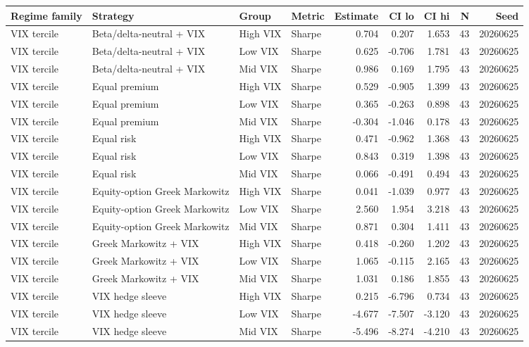 \begin{tabular}{llllrrrrr}
\toprule
Regime family & Strategy & Group & Metric & Estimate & CI lo & CI hi & N & Seed \\
\midrule
VIX tercile & Beta/delta-neutral + VIX & High VIX & Sharpe & 0.704 & 0.207 & 1.653 & 43 & 20260625 \\
VIX tercile & Beta/delta-neutral + VIX & Low VIX & Sharpe & 0.625 & -0.706 & 1.781 & 43 & 20260625 \\
VIX tercile & Beta/delta-neutral + VIX & Mid VIX & Sharpe & 0.986 & 0.169 & 1.795 & 43 & 20260625 \\
VIX tercile & Equal premium & High VIX & Sharpe & 0.529 & -0.905 & 1.399 & 43 & 20260625 \\
VIX tercile & Equal premium & Low VIX & Sharpe & 0.365 & -0.263 & 0.898 & 43 & 20260625 \\
VIX tercile & Equal premium & Mid VIX & Sharpe & -0.304 & -1.046 & 0.178 & 43 & 20260625 \\
VIX tercile & Equal risk & High VIX & Sharpe & 0.471 & -0.962 & 1.368 & 43 & 20260625 \\
VIX tercile & Equal risk & Low VIX & Sharpe & 0.843 & 0.319 & 1.398 & 43 & 20260625 \\
VIX tercile & Equal risk & Mid VIX & Sharpe & 0.066 & -0.491 & 0.494 & 43 & 20260625 \\
VIX tercile & Equity-option Greek Markowitz & High VIX & Sharpe & 0.041 & -1.039 & 0.977 & 43 & 20260625 \\
VIX tercile & Equity-option Greek Markowitz & Low VIX & Sharpe & 2.560 & 1.954 & 3.218 & 43 & 20260625 \\
VIX tercile & Equity-option Greek Markowitz & Mid VIX & Sharpe & 0.871 & 0.304 & 1.411 & 43 & 20260625 \\
VIX tercile & Greek Markowitz + VIX & High VIX & Sharpe & 0.418 & -0.260 & 1.202 & 43 & 20260625 \\
VIX tercile & Greek Markowitz + VIX & Low VIX & Sharpe & 1.065 & -0.115 & 2.165 & 43 & 20260625 \\
VIX tercile & Greek Markowitz + VIX & Mid VIX & Sharpe & 1.031 & 0.186 & 1.855 & 43 & 20260625 \\
VIX tercile & VIX hedge sleeve & High VIX & Sharpe & 0.215 & -6.796 & 0.734 & 43 & 20260625 \\
VIX tercile & VIX hedge sleeve & Low VIX & Sharpe & -4.677 & -7.507 & -3.120 & 43 & 20260625 \\
VIX tercile & VIX hedge sleeve & Mid VIX & Sharpe & -5.496 & -8.274 & -4.210 & 43 & 20260625 \\

\end{tabular}
